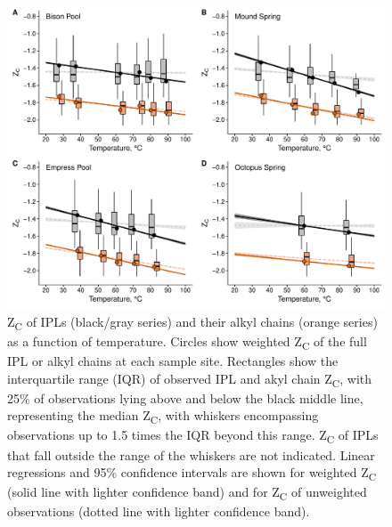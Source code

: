 \singlespace
\begin{figure}[h]
\centering
\includegraphics[width=1\linewidth]{"figs_ch1/boxplot - alkyl chain and full IPL ZC"}
\caption[Z\textsubscript{C} of IPLs and alkyl chains as a function of temperature]{Z\textsubscript{C} of IPLs (black/gray series) and their alkyl chains (orange series) as a function of temperature. Circles show weighted Z\textsubscript{C} of the full IPL or alkyl chains at each sample site. Rectangles show the interquartile range (IQR) of observed IPL and akyl chain Z\textsubscript{C}, with 25\% of observations lying above and below the black middle line, representing the median Z\textsubscript{C}, with whiskers encompassing observations up to 1.5 times the IQR beyond this range. Z\textsubscript{C} of IPLs that fall outside the range of the whiskers are not indicated. Linear regressions and 95\% confidence intervals are shown for weighted Z\textsubscript{C} (solid line with lighter confidence band) and for Z\textsubscript{C} of unweighted observations (dotted line with lighter confidence band).}
\label{fig:ZC}
\end{figure}
\doublespace


